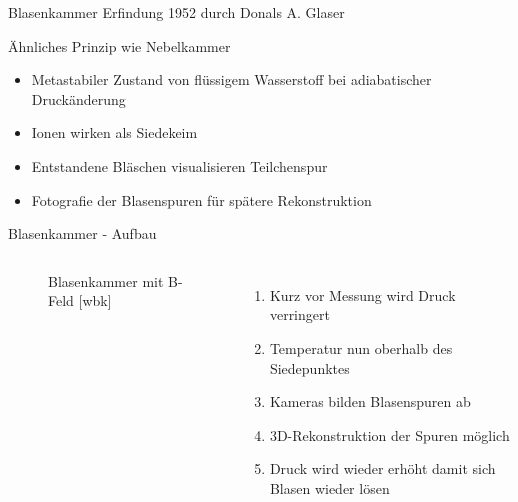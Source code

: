 \documentclass{beamer}
\begin{document}

\begin{frame}{Blasenkammer}
	Erfindung 1952 durch Donals A. Glaser
	\begin{block}{Ähnliches Prinzip wie Nebelkammer}
		\begin{itemize}
		  \item Metastabiler Zustand von flüssigem Wasserstoff bei adiabatischer
		  Druckänderung
		  \item Ionen wirken als Siedekeim
		  \item Entstandene Bläschen visualisieren Teilchenspur 
		  \item Fotografie der Blasenspuren für spätere Rekonstruktion
		\end{itemize}
	\end{block}
\end{frame}


\begin{frame}{Blasenkammer - Aufbau}
    \begin{columns}[T]
    
			\begin{figure}[htbp]
			  \centering
			  
			  \caption{Blasenkammer mit B-Feld [wbk]}
			\end{figure}
			
	    	\begin{enumerate}
			  \item Kurz vor Messung wird Druck verringert
			  \item Temperatur nun oberhalb des Siedepunktes
			  \item Kameras bilden Blasenspuren ab
			  \item 3D-Rekonstruktion der Spuren möglich
			  \item Druck wird wieder erhöht damit sich Blasen wieder lösen  
			\end{enumerate}
    \end{columns}
\end{frame}

\end{document}
